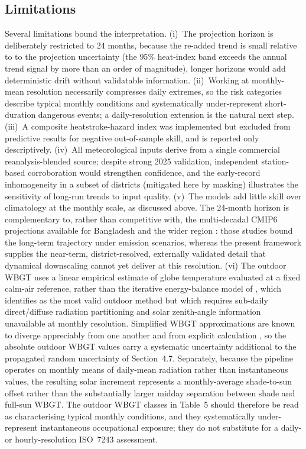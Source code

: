 \documentclass[review,11pt]{elsarticle}
\begin{document}
\subsection{Limitations}
Several limitations bound the interpretation. (i)~The projection horizon is
deliberately restricted to 24 months, because the re-added trend is small relative to
to the projection uncertainty (the $95\%$ heat-index band exceeds the annual
trend signal by more than an order of magnitude), longer horizons would add
deterministic drift without validatable information. (ii)~Working at monthly-mean
resolution necessarily compresses daily extremes, so the risk categories describe
typical monthly conditions and systematically under-represent short-duration
dangerous events; a daily-resolution extension is the natural next step.
(iii)~A composite heatstroke-hazard index was implemented but excluded from
predictive results for negative out-of-sample skill, and is reported only
descriptively. (iv)~All meteorological inputs derive from a single commercial
reanalysis-blended source; despite strong 2025 validation, independent
station-based corroboration would strengthen confidence, and the early-record
inhomogeneity in a subset of districts (mitigated here by masking) illustrates the
sensitivity of long-run trends to input quality. (v)~The models add little skill
over climatology at the monthly scale, as discussed above. The 24-month horizon is
complementary to, rather than competitive with, the multi-decadal CMIP6 projections
available for Bangladesh and the wider region \citep{khatun2024,kushwaha2026humidex}:
those studies bound the long-term trajectory under emission scenarios, whereas the
present framework supplies the near-term, district-resolved, externally validated
detail that dynamical downscaling cannot yet deliver at this resolution. (vi) The outdoor WBGT uses a linear empirical estimate of globe temperature evaluated at a fixed calm-air reference, rather than the iterative energy-balance model of \citet{liljegren2008}, which \citet{lemke2012} identifies as the most valid outdoor method but which requires sub-daily direct/diffuse radiation partitioning and solar
zenith-angle information unavailable at monthly resolution. Simplified WBGT approximations are known to diverge appreciably from one another and from explicit calculation \citep{kong2022}, so the absolute outdoor WBGT values carry a systematic uncertainty additional to the propagated random uncertainty of Section~4.7. Separately, because the pipeline operates on monthly means of daily-mean radiation rather than instantaneous values, the resulting solar increment represents a monthly-average shade-to-sun offset rather than the substantially larger midday separation between shade and full-sun WBGT. The outdoor WBGT classes in Table~5 should
therefore be read as characterising typical monthly conditions, and they systematically under-represent instantaneous occupational exposure; they do not substitute for a daily- or hourly-resolution ISO~7243 assessment.
\end{document}
